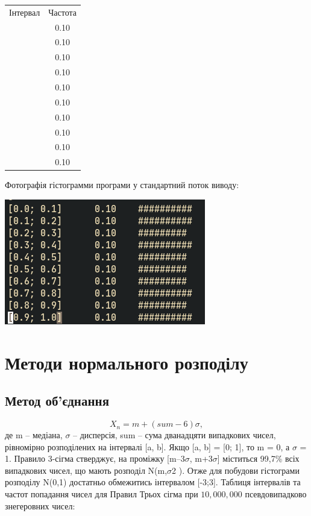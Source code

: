 \documentclass[a4paper,12pt]{report}
\begin{document}
\begin{table}[ht]
\centering %
\begin{tabular}{c c} %
  Інтервал & Частота \\\relax
  [0.0; 0.1] & 0.10 \\\relax
  [0.1; 0.2] & 0.10 \\\relax
  [0.2; 0.3] & 0.10 \\\relax
  [0.3; 0.4] & 0.10 \\\relax
  [0.4; 0.5] & 0.10 \\\relax
  [0.5; 0.6] & 0.10 \\\relax
  [0.6; 0.7] & 0.10 \\\relax
  [0.7; 0.8] & 0.10 \\\relax
  [0.8; 0.9] & 0.10 \\\relax
  [0.9; 1.0] & 0.10
\end{tabular}
\end{table}
Фотографія гістограмми програми у стандартний поток виводу:
\begin{center}\includegraphics[scale=0.5]{union}\end{center}

\section{Методи нормального розподілу}

\subsection{Метод об’єднання}
\[X_{n} = m + (sum - 6) \sigma ,\]
де m – медіана, $\sigma$ – дисперсія, sum – сума дванадцяти випадкових чисел, рівномірно
розподілених на інтервалі [a, b]. Якщо [a, b] = [0; 1], то m = 0, а $\sigma$ = 1. Правило 3-сігма
стверджує, на проміжку [m–3$\sigma$, m+3$\sigma$] міститься 99,7\% всіх випадкових чисел, що
мають розподіл N(m,$\sigma$2 ). Отже для побудови гістограми розподілу N(0,1) достатньо
обмежитись інтервалом [-3;3].
Таблиця інтервалів та частот попадання чисел для Правил Трьох сігма при $10,000,000$ псевдовипадково знегеровних чисел:
\end{document}

